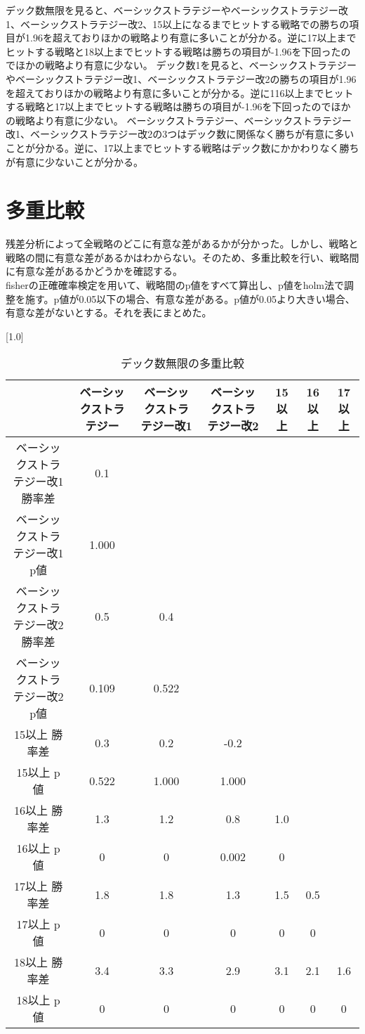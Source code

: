 デック数無限を見ると、ベーシックストラテジーやベーシックストラテジー改1、ベーシックストラテジー改2、15以上になるまでヒットする戦略での勝ちの項目が1.96を超えておりほかの戦略より有意に多いことが分かる。逆に17以上までヒットする戦略と18以上までヒットする戦略は勝ちの項目が-1.96を下回ったのでほかの戦略より有意に少ない。
デック数1を見ると、ベーシックストラテジーやベーシックストラテジー改1、ベーシックストラテジー改2の勝ちの項目が1.96を超えておりほかの戦略より有意に多いことが分かる。逆に116以上までヒットする戦略と17以上までヒットする戦略は勝ちの項目が-1.96を下回ったのでほかの戦略より有意に少ない。
ベーシックストラテジー、ベーシックストラテジー改1、ベーシックストラテジー改2の3つはデック数に関係なく勝ちが有意に多いことが分かる。逆に、17以上までヒットする戦略はデック数にかかわりなく勝ちが有意に少ないことが分かる。
\section{多重比較}
残差分析によって全戦略のどこに有意な差があるかが分かった。しかし、戦略と戦略の間に有意な差があるかはわからない。そのため、多重比較を行い、戦略間に有意な差があるかどうかを確認する。\\
fisherの正確確率検定を用いて、戦略間のp値をすべて算出し、p値をholm法で調整を施す。p値が0.05以下の場合、有意な差がある。p値が0.05より大きい場合、有意な差がないとする。それを表にまとめた。
\begin{table}[H]
 \begin{center}
 \small
 \scalebox{0.8}[1.0]{
  \begin{tabular}{|c|c|c|c|c|c|c|}
    \hline & ベーシックストラテジー & ベーシックストラテジー改1 & ベーシックストラテジー改2 & 15以上 & 16以上 & 17以上 \\
    \hline ベーシックストラテジー改1 勝率差 & 0.1 &  &  &  &  &   \\
    ベーシックストラテジー改1 p値 & 1.000 &  &  &  &  &    \\
    \hline ベーシックストラテジー改2 勝率差 & 0.5 & 0.4 & & & &  \\
    ベーシックストラテジー改2 p値 & 0.109 & 0.522 & & & &   \\
    \hline 15以上 勝率差 & 0.3 & 0.2 & -0.2 & & &   \\
    15以上 p値 & 0.522 & 1.000 & 1.000 & & &  \\
    \hline 16以上 勝率差 & 1.3 & 1.2 & 0.8 & 1.0 & &  \\
    16以上 p値 & 0 & 0 & 0.002 & 0 & &  \\
    \hline 17以上 勝率差 & 1.8 & 1.8 & 1.3 & 1.5 & 0.5 &  \\
    17以上 p値 & 0 & 0 & 0 & 0 & 0 & \\
    \hline 18以上 勝率差 & 3.4 & 3.3 & 2.9 & 3.1 & 2.1 & 1.6  \\
    18以上 p値 & 0 & 0 & 0 & 0 & 0 & 0  \\
    \hline
  \end{tabular}
 }
 \end{center}
 \caption{デック数無限の多重比較}
\end{table}
